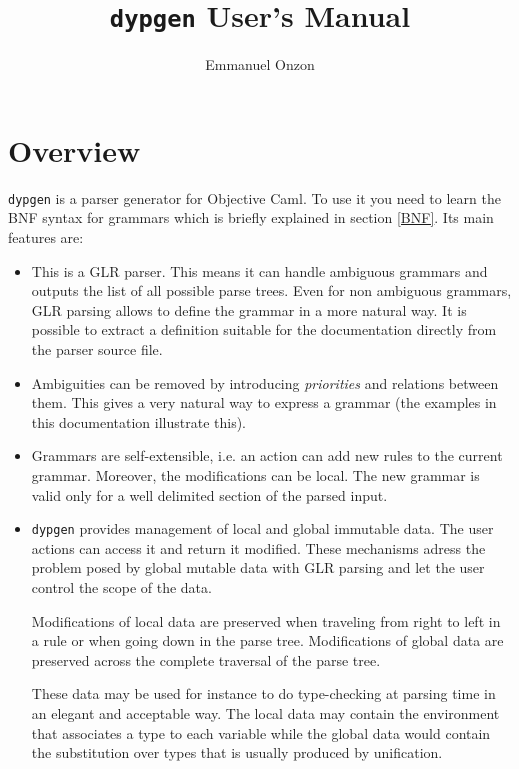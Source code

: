 \documentclass[12pt]{article}
\title{\texttt{dypgen} User's Manual}
\author{Emmanuel Onzon}
\begin{document}
\maketitle

\section*{Overview}

\texttt{dypgen} is a parser generator for Objective Caml.
  To use it you need to learn the BNF syntax for grammars
  which is briefly explained in section \ref{BNF}.
 Its main features are:
\begin{itemize}
\item This is a GLR parser. This means it can handle ambiguous
  grammars and outputs the list of all possible parse trees. Even for
  non ambiguous grammars, GLR parsing allows to define the grammar in
  a more natural way. It is possible to extract a definition suitable
  for the documentation directly from the parser source file.
  
\item Ambiguities can be removed by introducing {\em priorities} and
  relations between them. This gives a very natural way to express a
  grammar (the examples in this documentation illustrate this).

\item Grammars are self-extensible, i.e. an action can add new rules to the
  current grammar. Moreover, the modifications can be local. The new
  grammar is valid only for a well delimited section of the parsed input.
 
\item \verb#dypgen# provides management of local and global immutable data.
  The user actions can access it and return it modified. These mechanisms
  adress the problem posed by global mutable data with GLR parsing and let
  the user control the scope of the data.
  
  Modifications of local data are preserved when traveling from right to
  left in a rule or when going down in the parse tree. Modifications of
  global data are preserved across the complete traversal of the parse
  tree.

  These data may be used for instance to do type-checking at parsing
  time in an elegant and acceptable way. The local data may
  contain the environment that associates a type to each variable while the
  global data would contain the substitution over types that is
  usually produced by unification.
  

\end{itemize}
\end{document}
